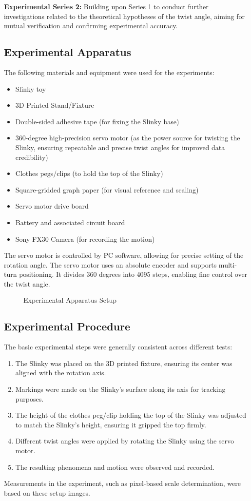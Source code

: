 \documentclass{mcmthesis}  %
\begin{document}
\textbf{Experimental Series 2:} Building upon Series 1 to conduct further investigations related to the theoretical hypotheses of the twist angle, aiming for mutual verification and confirming experimental accuracy.

\subsection{Experimental Apparatus}
The following materials and equipment were used for the experiments:
\begin{itemize}
    \item Slinky toy
    \item 3D Printed Stand/Fixture
    \item Double-sided adhesive tape (for fixing the Slinky base)
    \item 360-degree high-precision servo motor (as the power source for twisting the Slinky, ensuring repeatable and precise twist angles for improved data credibility)
    \item Clothes pegs/clips (to hold the top of the Slinky)
    \item Square-gridded graph paper (for visual reference and scaling)
    \item Servo motor drive board
    \item Battery and associated circuit board
    \item Sony FX30 Camera (for recording the motion)
\end{itemize}
The servo motor is controlled by PC software, allowing for precise setting of the rotation angle. The servo motor uses an absolute encoder and supports multi-turn positioning. It divides 360 degrees into 4095 steps, enabling fine control over the twist angle.

\begin{figure}[h!]
    \centering
    \caption{Experimental Apparatus Setup}
    \label{fig:exp_apparatus}
\end{figure}

\subsection{Experimental Procedure}
The basic experimental steps were generally consistent across different tests:
\begin{enumerate}
    \item The Slinky was placed on the 3D printed fixture, ensuring its center was aligned with the rotation axis.
    \item Markings were made on the Slinky's surface along its axis for tracking purposes.
    \item The height of the clothes peg/clip holding the top of the Slinky was adjusted to match the Slinky's height, ensuring it gripped the top firmly.
    \item Different twist angles were applied by rotating the Slinky using the servo motor.
    \item The resulting phenomena and motion were observed and recorded.
\end{enumerate}
Measurements in the experiment, such as pixel-based scale determination, were based on these setup images.
\end{document}
